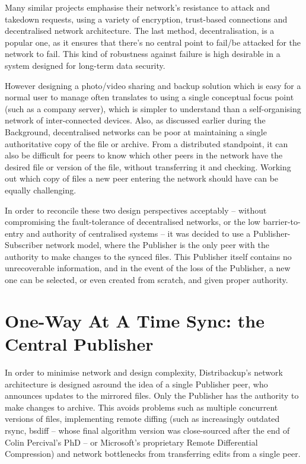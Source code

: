 \documentclass[12pt,a4paper,]{adreport}
\begin{document}
Many similar projects emphasise their network's resistance to attack and
takedown requests, using a variety of encryption, trust-based
connections and decentralised network architecture. The last method,
decentralisation, is a popular one, as it ensures that there's no
central point to fail/be attacked for the network to fail. This kind of
robustness against failure is high desirable in a system designed for
long-term data security.

However designing a photo/video sharing and backup solution which is
easy for a normal user to manage often translates to using a single
conceptual focus point (such as a company server), which is simpler to
understand than a self-organising network of inter-connected devices.
Also, as discussed earlier during the Background, decentralised networks
can be poor at maintaining a single authoritative copy of the file or
archive. From a distributed standpoint, it can also be difficult for
peers to know which other peers in the network have the desired file or
version of the file, without transferring it and checking. Working out
which copy of files a new peer entering the network should have can be
equally challenging.

In order to reconcile these two design perspectives acceptably --
without compromising the fault-tolerance of decentralised networks, or
the low barrier-to-entry and authority of centralised systems -- it was
decided to use a Publisher-Subscriber network model, where the Publisher
is the only peer with the authority to make changes to the synced files.
This Publisher itself contains no unrecoverable information, and in the
event of the loss of the Publisher, a new one can be selected, or even
created from scratch, and given proper authority.

\section{One-Way At A Time Sync: the Central
Publisher}\label{one-way-at-a-time-sync-the-central-publisher}

In order to minimise network and design complexity, Distribackup's
network architecture is designed asround the idea of a single Publisher
peer, who announces updates to the mirrored files. Only the Publisher
has the authority to make changes to archive. This avoids problems such
as multiple concurrent versions of files, implementing remote diffing
(such as increasingly outdated rsync, bsdiff -- whose final algorithm
version was close-sourced after the end of Colin Percival's PhD -- or
Microsoft's proprietary Remote Differential Compression) and network
bottlenecks from transferring edits from a single peer.
\end{document}
